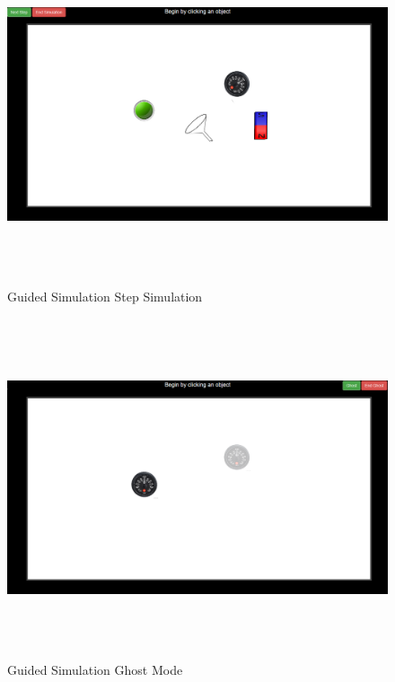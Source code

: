 \documentclass[12pt]{report}
\begin{document}
\begin{figure}[H]
 \centering 
 \includegraphics[width=15cm, height=10cm]{./311.jpg}
 \caption{Guided Simulation Step Simulation \label{fig:311}}
\end{figure}
\begin{figure}[H]
 \centering 
 \includegraphics[width=15cm, height=10cm]{./312.jpg}
 \caption{Guided Simulation Ghost Mode \label{fig:312}}
\end{figure}
\end{document}
